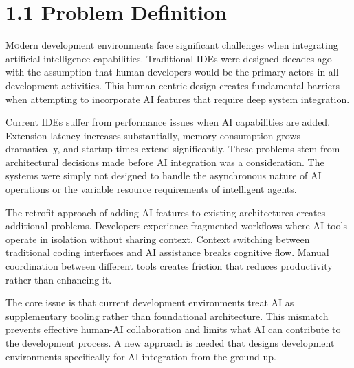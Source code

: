 
\section{1.1 Problem Definition}
\label{sec:problem-definition}

\lettrine{M}odern development environments face significant challenges when integrating artificial intelligence capabilities. Traditional IDEs were designed decades ago with the assumption that human developers would be the primary actors in all development activities. This human-centric design creates fundamental barriers when attempting to incorporate AI features that require deep system integration.

Current IDEs suffer from performance issues when AI capabilities are added. Extension latency increases substantially, memory consumption grows dramatically, and startup times extend significantly. These problems stem from architectural decisions made before AI integration was a consideration. The systems were simply not designed to handle the asynchronous nature of AI operations or the variable resource requirements of intelligent agents.

The retrofit approach of adding AI features to existing architectures creates additional problems. Developers experience fragmented workflows where AI tools operate in isolation without sharing context. Context switching between traditional coding interfaces and AI assistance breaks cognitive flow. Manual coordination between different tools creates friction that reduces productivity rather than enhancing it.

The core issue is that current development environments treat AI as supplementary tooling rather than foundational architecture. This mismatch prevents effective human-AI collaboration and limits what AI can contribute to the development process. A new approach is needed that designs development environments specifically for AI integration from the ground up.
